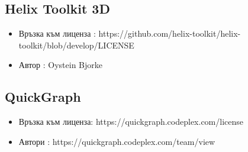 \subsection{Helix Toolkit 3D}
\begin{itemize}
    \item Връзка към лиценза : https://github.com/helix-toolkit/helix-toolkit/blob/develop/LICENSE
    \item Автор : Oystein Bjorke
\end{itemize}

\subsection{QuickGraph}
\begin{itemize}
    \item Връзка към лиценза: https://quickgraph.codeplex.com/license
    \item Автори : https://quickgraph.codeplex.com/team/view
\end{itemize}
